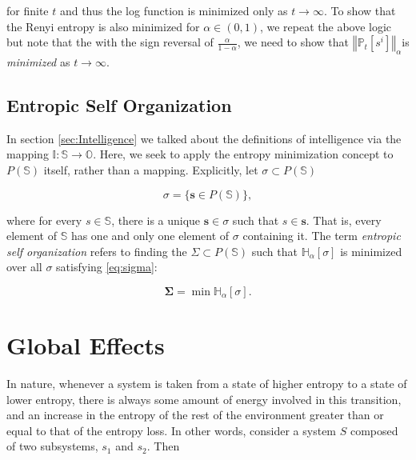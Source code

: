 \documentclass[english]{article}
\begin{document}
for finite $t$ and thus the log function is minimized only as $t\rightarrow\infty$.
To show that the Renyi entropy is also minimized for $\alpha\in(0,1)$,
we repeat the above logic but note that the with the sign reversal
of $\frac{\alpha}{1-\alpha}$, we need to show that $\left\Vert \mathbb{P}_{t}\left[s^{i}\right]\right\Vert _{\alpha}$is
\emph{minimized} as $t\rightarrow\infty$.


\subsection{Entropic Self Organization\label{sub:Entropic-Self-Organization}}

In section \ref{sec:Intelligence} we talked about the definitions
of intelligence via the mapping $\mathbb{I}:\mathbb{S}\rightarrow\mathbb{O}$.
Here, we seek to apply the entropy minimization concept to $P(\mathbb{S})$
itself, rather than a mapping. Explicitly, let $\sigma\subset P(\mathbb{S})$ 

\begin{equation}
\sigma=\{\mathbf{s}\in P(\mathbb{S})\},\label{eq:sigma}
\end{equation}


where for every $s\in\mathbb{S}$, there is a unique $\mathbf{s}\in\sigma$
such that $s\in\mathbf{s}$. That is, every element of $\mathbb{S}$
has one and only one element of $\sigma$ containing it. The term
\emph{entropic self organization} refers to finding the $\Sigma\subset P(\mathbb{S})$
such that $\mathbb{H}_{\alpha}[\sigma]$ is minimized over all $\sigma$
satisfying \ref{eq:sigma}:

\begin{equation}
\mathbf{\Sigma}=\min\mathbb{H}_{\alpha}[\sigma].
\end{equation}



\section{Global Effects\label{sec:Global-Effects}}

In nature, whenever a system is taken from a state of higher entropy
to a state of lower entropy, there is always some amount of energy
involved in this transition, and an increase in the entropy of the
rest of the environment greater than or equal to that of the entropy
loss\cite{sc}. In other words, consider a system $S$ composed of
two subsystems, $s_{1}$ and $s_{2}$. Then 
\end{document}

